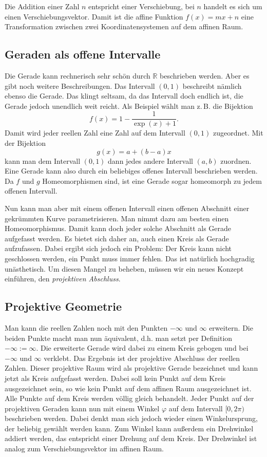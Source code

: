 \documentclass[a4paper,11pt,fleqn,twocolumn,twoside]{article}
\newcommand{\R}{\mathbb R}
\begin{document}
Die Addition einer Zahl $n$ entspricht einer Verschiebung,
bei $n$ handelt es sich um einen Verschiebungsvektor. Damit ist
die affine Funktion $f(x)=mx+n$ eine Transformation zwischen zwei
Koordinatensystemen auf dem affinen Raum.

\subsection{Geraden als offene Intervalle}
Die Gerade kann rechnerisch sehr schön durch $\R$ beschrieben
werden. Aber es gibt noch weitere Beschreibungen. Das Intervall
$(0,1)$ beschreibt nämlich ebenso die Gerade. Das klingt seltsam,
da das Intervall doch endlich ist, die Gerade jedoch unendlich weit
reicht. Als Beispiel wählt man z.\,B. die Bijektion
\begin{equation}
f(x) = 1-\frac{1}{\exp(x)+1}.
\end{equation}
Damit wird jeder reellen Zahl eine Zahl auf dem Intervall $(0,1)$
zugeordnet. Mit der Bijektion
\begin{equation}
g(x) = a+(b-a)x
\end{equation}
kann man dem Intervall $(0,1)$ dann jedes andere Intervall
$(a,b)$ zuordnen. Eine Gerade kann also durch ein beliebiges offenes
Intervall beschrieben werden. Da $f$ und $g$ Homeomorphismen sind,
ist eine Gerade sogar homeomorph zu jedem offenen Intervall.

Nun kann man aber mit einem offenen Intervall einen offenen Abschnitt
einer gekrümmten Kurve parametrisieren. Man nimmt dazu am besten
einen Homeomorphismus. Damit kann doch jeder solche Abschnitt als
Gerade aufgefasst werden. Es bietet sich daher an, auch einen Kreis
als Gerade aufzufassen. Dabei ergibt sich jedoch ein Problem: Der
Kreis kann nicht geschlossen werden, ein Punkt muss immer fehlen.
Das ist natürlich hochgradig unästhetisch. Um diesen Mangel zu
beheben, müssen wir ein neues Konzept einführen, den
\textit{projektiven Abschluss}.

\subsection{Projektive Geometrie}

Man kann die reellen Zahlen noch mit den Punkten $-\infty$
und $\infty$ erweitern. Die beiden Punkte macht man nun äquivalent,
d.h. man setzt per Definition $-\infty:=\infty$. Die erweiterte
Gerade wird dabei zu einem Kreis gebogen und bei $-\infty$ und
$\infty$ verklebt. Das Ergebnis ist der projektive Abschluss der
reellen Zahlen. Dieser projektive Raum wird als projektive Gerade
bezeichnet und kann jetzt als Kreis aufgefasst werden. Dabei soll
kein Punkt auf dem Kreis ausgezeichnet sein, so wie kein Punkt auf
dem affinen Raum ausgezeichnet ist. Alle Punkte auf dem Kreis werden
völlig gleich behandelt. Jeder Punkt auf der projektiven Geraden kann
nun mit einem Winkel $\varphi$ auf dem Intervall $[0,2\pi)$
beschrieben werden. Dabei denkt man sich jedoch wieder einen
Winkelursprung, der beliebig gewählt werden kann. Zum Winkel kann
außerdem ein Drehwinkel addiert werden, das entspricht einer Drehung
auf dem Kreis. Der Drehwinkel ist analog zum Verschiebungsvektor im
affinen Raum.
\end{document}
